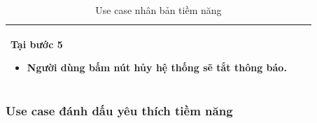 \documentclass[12pt,a4paper]{article}
\begin{document}
\begin{table}[H]
\begin{tabular}{|p{3.5cm}|p{11.5cm}|c|}
            Tại bước 5\newline
            \vspace{-.8cm}\begin{itemize}
                              \item Người dùng bấm nút hủy hệ thống sẽ tắt thông báo.
            \end{itemize} \\
            \hline
        \end{tabular}
        \caption{Use case nhân bản tiềm năng }
    \end{table}


    \subsubsection*{Use case đánh dấu yêu thích tiềm năng}
\end{document}
